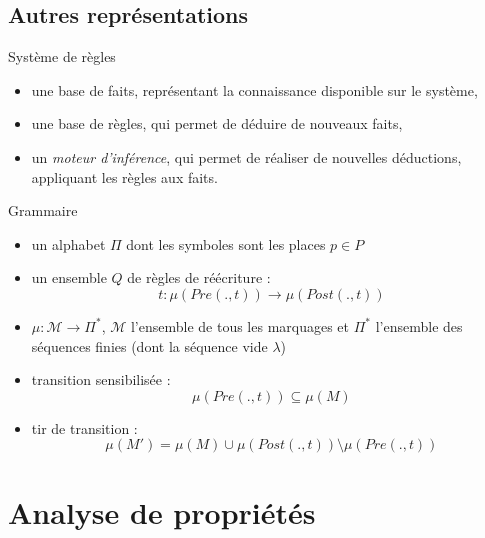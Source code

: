 \documentclass[compress]{beamer}
\begin{document}
\subsection{Autres représentations}
\begin{frame}{Système de règles}
\begin{itemize}
\item une base de faits, représentant la connaissance disponible sur le système,
\item une base de règles, qui permet de déduire de nouveaux faits,
\item un {\em moteur d'inférence}, qui permet de
réaliser de nouvelles déductions, appliquant les règles aux faits.
\end{itemize}
\end{frame}

\begin{frame}{Grammaire}
\begin{itemize}
\item un alphabet $\Pi$ dont les symboles sont les places $p \in P$
\item un ensemble $Q$ de règles de réécriture :
$$t: \mu(Pre(.,t)) \rightarrow \mu(Post(.,t))$$
\item $\mu: \mathcal{M} \rightarrow {\Pi}^*$, $\mathcal{M}$ l'ensemble de tous les marquages et ${\Pi}^*$ l'ensemble des séquences finies (dont la séquence vide $\lambda$)
\item transition sensibilisée : 
$$\mu(Pre(.,t)) \subseteq \mu(M)$$
\item tir de transition : 
$$\mu(M')=\mu(M) \cup \mu(Post(.,t)) \setminus \mu(Pre(.,t))$$
\end{itemize}
\end{frame}

\section{Analyse de propriétés}
\end{document}
